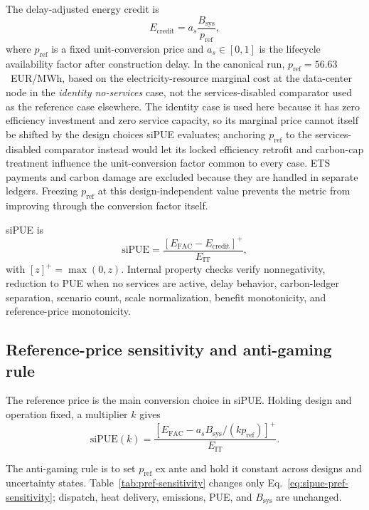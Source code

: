 \documentclass[preprint,12pt]{elsarticle}
\begin{document}
The delay-adjusted energy credit is
\begin{equation}
E_{\text{credit}} =
a_s \frac{B_{\text{sys}}}{p_{\text{ref}}},
\label{eq:sipue-credit}
\end{equation}
where $p_{\text{ref}}$ is a fixed unit-conversion price and $a_s \in [0,1]$ is the lifecycle availability factor after construction delay. In the canonical run, $p_{\text{ref}}=56.63$~EUR/MWh, based on the electricity-resource marginal cost at the data-center node in the \emph{identity no-services} case, not the services-disabled comparator used as the reference case elsewhere. The identity case is used here because it has zero efficiency investment and zero service capacity, so its marginal price cannot itself be shifted by the design choices siPUE evaluates; anchoring $p_{\text{ref}}$ to the services-disabled comparator instead would let its locked efficiency retrofit and carbon-cap treatment influence the unit-conversion factor common to every case. ETS payments and carbon damage are excluded because they are handled in separate ledgers. Freezing $p_{\text{ref}}$ at this design-independent value prevents the metric from improving through the conversion factor itself.

siPUE is
\begin{equation}
\text{siPUE} =
\frac{\left[E_{\text{FAC}} - E_{\text{credit}}\right]^+}{E_{\text{IT}}},
\label{eq:sipue}
\end{equation}
with $[z]^+=\max(0,z)$. Internal property checks verify nonnegativity, reduction to PUE when no services are active, delay behavior, carbon-ledger separation, scenario count, scale normalization, benefit monotonicity, and reference-price monotonicity.

\subsection{Reference-price sensitivity and anti-gaming rule}
\label{sec:pref-sensitivity}

The reference price is the main conversion choice in siPUE. Holding design and operation fixed, a multiplier $k$ gives
\begin{equation}
\text{siPUE}(k) =
\frac{\left[E_{\text{FAC}} - a_s B_{\text{sys}} /(k p_{\text{ref}})\right]^+}{E_{\text{IT}}}.
\label{eq:sipue-pref-sensitivity}
\end{equation}

The anti-gaming rule is to set $p_{\text{ref}}$ ex ante and hold it constant across designs and uncertainty states. Table~\ref{tab:pref-sensitivity} changes only Eq.~\ref{eq:sipue-pref-sensitivity}; dispatch, heat delivery, emissions, PUE, and $B_{\text{sys}}$ are unchanged.
\end{document}
